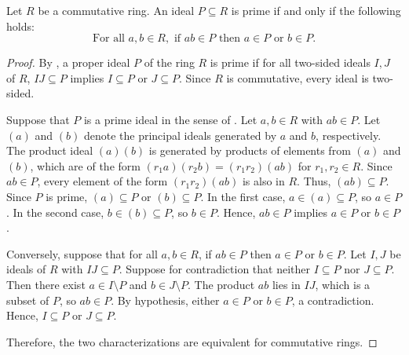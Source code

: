 \begin{lemma} \label{lemma:prime_ideal_characterization_for_a_commutative_ring}
    Let $R$ be a commutative ring. An ideal $P \subseteq R$ is prime if and only if the following holds:
    $$\text{For all } a,b \in R, \text{ if } ab \in P \text{ then } a \in P \text{ or } b \in P.$$
\end{lemma}

\begin{proof}
    By , a proper ideal $P$ of the ring $R$ is prime if for all two-sided ideals $I,J$ of $R$, $IJ \subseteq P$ implies $I \subseteq P$ or $J \subseteq P$. Since $R$ is commutative, every ideal is two-sided.

    Suppose that $P$ is a prime ideal in the sense of . Let $a,b \in R$ with $ab \in P$. Let $(a)$ and $(b)$ denote the principal ideals generated by $a$ and $b$, respectively. The product ideal $(a)(b)$ is generated by products of elements from $(a)$ and $(b)$, which are of the form $(r_1 a)(r_2 b) = (r_1r_2)(ab)$ for $r_1,r_2 \in R$. Since $ab \in P$, every element of the form $(r_1r_2)(ab)$ is also in $R$. Thus, $(ab) \subseteq P$. Since $P$ is prime, $(a) \subseteq P$ or $(b) \subseteq P$. In the first case, $a \in (a) \subseteq P$, so $a \in P$. In the second case, $b \in (b) \subseteq P$, so $b \in P$. Hence, $ab \in P$ implies $a \in P$ or $b \in P$.

    Conversely, suppose that for all $a,b \in R$, if $ab \in P$ then $a \in P$ or $b \in P$. Let $I,J$ be ideals of $R$ with $IJ \subseteq P$. Suppose for contradiction that neither $I \subseteq P$ nor $J \subseteq P$. Then there exist $a \in I \setminus P$ and $b \in J \setminus P$. The product $ab$ lies in $IJ$, which is a subset of $P$, so $ab \in P$. By hypothesis, either $a \in P$ or $b \in P$, a contradiction. Hence, $I \subseteq P$ or $J \subseteq P$.

    Therefore, the two characterizations are equivalent for commutative rings.
\end{proof}

